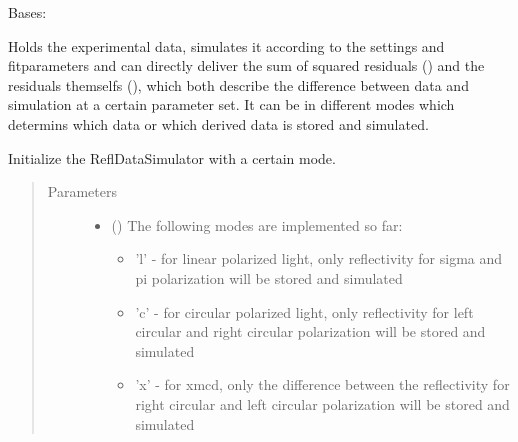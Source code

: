 \documentclass[letterpaper,10pt,english]{sphinxmanual}
\begin{document}
\begin{fulllineitems}
\label{\detokenize{modules-api/experiment:Experiment.ReflDataSimulator}}
Bases: 

Holds the experimental data, simulates it according to the settings and fitparameters and can directly deliver the sum of squared residuals ({\hyperref[\detokenize{modules-api/experiment:Experiment.ReflDataSimulator.getSimData}]{}}) and the residuals themselfs ({\hyperref[\detokenize{modules-api/experiment:Experiment.ReflDataSimulator.getResidualsSSR}]{}}), which both describe the difference between data and simulation at a certain parameter set. It can be in different modes which determins which data or which derived data is stored and simulated.

\begin{fulllineitems}
\label{\detokenize{modules-api/experiment:Experiment.ReflDataSimulator.__init__}}
Initialize the ReflDataSimulator with a certain mode.
\begin{quote}\begin{description}
\item[{Parameters}] \leavevmode\begin{itemize}
\item {} 
 () \textendash{} 
The following modes are implemented so far:
\begin{itemize}
\item {} 
’l’             - for linear polarized light, only reflectivity for sigma and pi polarization will be stored and simulated

\item {} 
’c’             - for circular polarized light, only reflectivity for left circular and right circular polarization will be stored and simulated

\item {} 
’x’             - for xmcd, only the difference between the reflectivity for right circular and left circular polarization will be stored and simulated


\end{itemize}
\end{itemize}
\end{description}
\end{quote}
\end{fulllineitems}
\end{fulllineitems}
\end{document}
